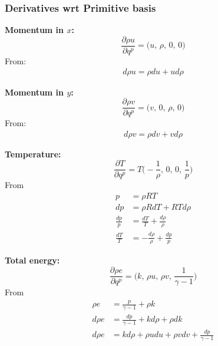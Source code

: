 \documentclass{article}
\begin{document}

\subsubsection{Derivatives wrt Primitive basis}

\textbf{Momentum in $x$:}
\begin{equation*}
    \frac{\partial \rho u}{\partial q^p} = \big( u,\, \rho,\, 0,\, 0 \big)
\end{equation*}
From:
\begin{equation*}
    \begin{split}
        d\rho u = \rho du + ud\rho
    \end{split}
\end{equation*}

\textbf{Momentum in $y$:}
\begin{equation*}
    \frac{\partial \rho v}{\partial q^p} = \big( v,\, 0,\, \rho,\, 0 \big)
\end{equation*}
From:
\begin{equation*}
    \begin{split}
        d\rho v = \rho dv + vd\rho
    \end{split}
\end{equation*}

\textbf{Temperature:}
\begin{equation*}
    \frac{\partial T}{\partial q^p} = T\big(-\frac{1}{\rho},\, 0,\, 0,\, \frac{1}{p} \big)
\end{equation*}
From
\begin{equation*}
    \begin{split}
        p  & = \rho R T \\
        dp & = \rho R dT + R T d\rho \\
        \frac{dp}{p} & = \frac{dT}{T} + \frac{d\rho}{\rho} \\
        \frac{dT}{T} & = -\frac{d\rho}{\rho} + \frac{dp}{p}
    \end{split}
\end{equation*}

\textbf{Total energy:}
\begin{equation*}
    \frac{\partial \rho e}{\partial q^p} = \big( k,\, \rho u,\, \rho v,\, \frac{1}{\gamma-1} \big)
\end{equation*}
From
\begin{equation*}
    \begin{split}
        \rho e  & = \frac{p}{\gamma-1} + \rho k \\
        d\rho e & = \frac{dp}{\gamma-1} + kd\rho + \rho dk \\
        d\rho e & = kd\rho + \rho u du + \rho v dv + \frac{dp}{\gamma-1}
    \end{split}
\end{equation*}
\end{document}
